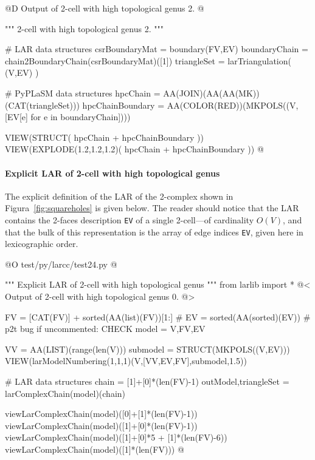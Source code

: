 \documentclass[11pt,oneside]{article}    %
\begin{document}
@D Output of 2-cell with high topological genus 2.
@{""" 2-cell with high topological genus 2. """

# LAR data structures
csrBoundaryMat = boundary(FV,EV)
boundaryChain = chain2BoundaryChain(csrBoundaryMat)([1])
triangleSet = larTriangulation( (V,EV) )

# PyPLaSM data structures
hpcChain = AA(JOIN)(AA(AA(MK))(CAT(triangleSet)))
hpcChainBoundary = AA(COLOR(RED))(MKPOLS((V,[EV[e] for e in boundaryChain])))

VIEW(STRUCT( hpcChain + hpcChainBoundary ))
VIEW(EXPLODE(1.2,1.2,1.2)( hpcChain + hpcChainBoundary ))
@}

\paragraph{Explicit LAR of 2-cell with high topological genus}

The explicit definition of the LAR of the 2-complex shown in Figura~\ref{fig:squareholes} is given below. The reader should notice that the LAR contains the 2-faces description \texttt{EV} of a single 2-cell---of cardinality $O(V)$, and that the bulk of this representation is the array of edge indices \texttt{EV}, given here in lexicographic order.

@O test/py/larcc/test24.py
@{""" Explicit LAR of 2-cell with high topological genus """
from larlib import *
@< Output of 2-cell with high topological genus 0. @>

FV = [CAT(FV)] + sorted(AA(list)(FV))[1:]
# EV = sorted(AA(sorted)(EV))  # p2t bug if uncommented: CHECK
model = V,FV,EV

VV = AA(LIST)(range(len(V)))
submodel = STRUCT(MKPOLS((V,EV)))
VIEW(larModelNumbering(1,1,1)(V,[VV,EV,FV],submodel,1.5)) 

# LAR data structures
chain = [1]+[0]*(len(FV)-1)
outModel,triangleSet = larComplexChain(model)(chain)

viewLarComplexChain(model)([0]+[1]*(len(FV)-1))
viewLarComplexChain(model)([1]+[0]*(len(FV)-1))
viewLarComplexChain(model)([1]+[0]*5 + [1]*(len(FV)-6))
viewLarComplexChain(model)([1]*(len(FV)))
@}
\end{document}

